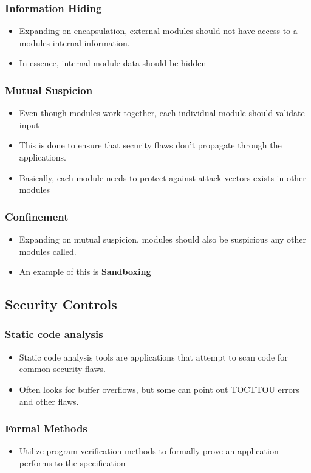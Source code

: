 \documentclass[twoside]{article}
\begin{document}
\subsubsection{Information Hiding}
\begin{itemize}
\item Expanding on encapsulation, external modules should not have access to a modules internal information.
\item In essence, internal module data should be hidden
\end{itemize}
\subsubsection{Mutual Suspicion}
\begin{itemize}
\item Even though modules work together, each individual module should validate input
\item This is done to ensure that security flaws don't propagate through the applications. 
\item Basically, each module needs to protect against attack vectors exists in other modules
\end{itemize}
\subsubsection{Confinement}
\begin{itemize}
\item Expanding on mutual suspicion, modules should also be suspicious any other modules called. 
\item An example of this is \textbf{Sandboxing}
\end{itemize}
\subsection{Security Controls}
\subsubsection{Static code analysis}
\begin{itemize}
\item Static code analysis tools are applications that attempt to scan code for common security flaws.
\item Often looks for buffer overflows, but some can point out TOCTTOU errors and other flaws.
\end{itemize}
\subsubsection{Formal Methods}
\begin{itemize}
\item Utilize program verification methods to formally prove an application performs to the specification
\end{itemize}
\end{document}
